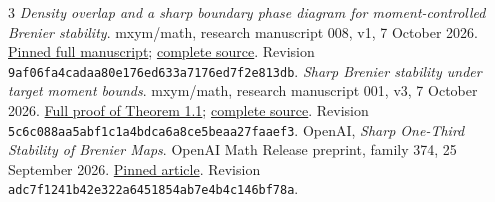 \documentclass[11pt]{article}
\theoremstyle{remark}\newtheorem{remark}[theorem]{Remark}
\begin{document}
\begingroup\small\raggedright
\begin{thebibliography}{3}
\emph{Density overlap and a sharp boundary phase diagram for moment-controlled Brenier stability}.
mxym/math, research manuscript 008, v1, 7 October 2026.
\href{https://github.com/mxym/math/blob/9af06fa4cadaa80e176ed633a7176ed7f2e813db/preprints/008-density-overlap-phase/v1/paper.pdf}{Pinned full manuscript};
\href{https://github.com/mxym/math/blob/9af06fa4cadaa80e176ed633a7176ed7f2e813db/preprints/008-density-overlap-phase/v1/main.tex}{complete source}.
Revision \texttt{9af06fa4cadaa80e176ed633a7176ed7f2e813db}.
\emph{Sharp Brenier stability under target moment bounds}.
mxym/math, research manuscript 001, v3, 7 October 2026.
\href{https://github.com/mxym/math/blob/5c6c088aa5abf1c1a4bdca6a8ce5beaa27faaef3/preprints/001-strongly-log-concave-brenier/v3/manuscript.pdf}{Full proof of Theorem 1.1};
\href{https://github.com/mxym/math/blob/5c6c088aa5abf1c1a4bdca6a8ce5beaa27faaef3/preprints/001-strongly-log-concave-brenier/v3/manuscript.tex}{complete source}.
Revision \texttt{5c6c088aa5abf1c1a4bdca6a8ce5beaa27faaef3}.
OpenAI, \emph{Sharp One-Third Stability of Brenier Maps}.
OpenAI Math Release preprint, family 374, 25 September 2026.
\href{https://github.com/openai/math/blob/adc7f1241b42e322a6451854ab7e4b4c146bf78a/preprints/Sharp-One-Third-Stability-of-Brenier-Maps-September-25-2026/article.pdf}{Pinned article}.
Revision \texttt{adc7f1241b42e322a6451854ab7e4b4c146bf78a}.
\end{thebibliography}
\endgroup
\end{document}
